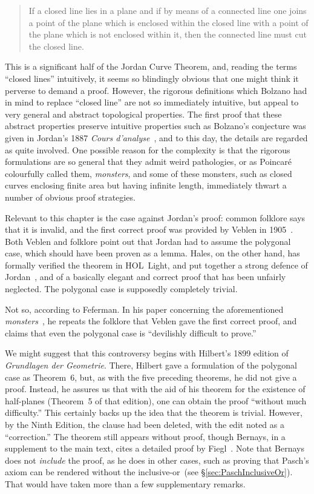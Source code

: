 \begin{quote}
If a closed line lies in a plane and if by means of a connected line one joins a point of the plane which is enclosed within the closed line with a point of the plane which is not enclosed within it, then the connected line must cut the closed line.
\end{quote}

This is a significant half of the Jordan Curve Theorem, and, reading the terms ``closed lines'' intuitively, it seems so blindingly obvious that one might think it perverse to demand a proof. However, the rigorous definitions which Bolzano had in mind to replace ``closed line'' are not so immediately intuitive, but appeal to very general and abstract topological properties. The first proof that these abstract properties preserve intuitive properties such as Bolzano's conjecture was given in Jordan's 1887 \emph{Cours d'analyse}~\cite{JordanTextBook}, and to this day, the details are regarded as quite involved. One possible reason for the complexity is that the rigorous formulations are so general that they admit weird pathologies, or as Poincar\'{e} colourfully called them, \emph{monsters}, and some of these monsters, such as closed curves enclosing finite area but having infinite length, immediately thwart a number of obvious proof strategies.

Relevant to this chapter is the case against Jordan's proof: common folklore says that it is invalid, and the first correct proof was provided by Veblen in 1905~\cite{VeblenJordan}. Both Veblen and folklore point out that Jordan had to assume the polygonal case, which should have been proven as a lemma. Hales, on the other hand, has formally verified the theorem in HOL~Light, and put together a strong defence of Jordan~\cite{HalesJordansProof}, and of a basically elegant and correct proof that has been unfairly neglected. The polygonal case is supposedly completely trivial. 

Not so, according to Feferman. In his paper concerning the aforementioned \emph{monsters}~\cite{IntuitionMonsters}, he repeats the folklore that Veblen gave the first correct proof, and claims that even the polygonal case is ``devilishly difficult to prove.''

We might suggest that this controversy begins with Hilbert's 1899 edition of \emph{Grundlagen der Geometrie}. There, Hilbert gave a formulation of the polygonal case as Theorem~6, but, as with the five preceding theorems, he did not give a proof. Instead, he assures us that with the aid of his theorem for the existence of half-planes (Theorem~5 of that edition), one can obtain the proof ``without much difficulty.'' This certainly backs up the idea that the theorem is trivial. However, by the Ninth Edition, the clause had been deleted, with the edit noted as a ``correction.'' The theorem still appears without proof, though Bernays, in a supplement to the main text, cites a detailed proof by Fiegl~\cite{FeiglJordan}. Note that Bernays does not \emph{include} the proof, as he does in other cases, such as proving that Pasch's axiom can be rendered without the inclusive-or~(see \S\ref{sec:PaschInclusiveOr}). That would have taken more than a few supplementary remarks.

